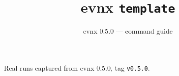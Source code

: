 \documentclass[aspectratio=169,10pt]{beamer}
\title{evnx \texttt{template}}
\subtitle{evnx 0.5.0 — command guide}
\date{}
\begin{document}
\begin{frame}[plain]\titlepage
  \begin{center}\footnotesize
  \textcolor{evnxMuted}{Real runs captured from evnx 0.5.0, tag \texttt{v0.5.0}.}
  \end{center}
\end{frame}

\end{document}
